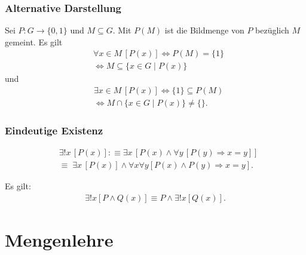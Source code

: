 \subsubsection{Alternative Darstellung}
Sei $P\colon G\to\{0,1\}$ und $M\subseteq G$.
Mit $P(M)$ ist die Bildmenge von $P$ bezüglich $M$ gemeint.
Es gilt
\begin{equation}
\begin{split}
&\forall x{\in}M\,[P(x)] \iff P(M)=\{1\}\\
& \iff M\subseteq\{x{\in}G\mid P(x)\}
\end{split}
\end{equation}
und
\begin{equation}
\begin{split}
& \exists x{\in}M\,[P(x)] \iff \{1\}\subseteq P(M)\\
& \iff M\cap\{x{\in}G\mid P(x)\}\ne\{\}.
\end{split}
\end{equation}

\subsubsection{Eindeutige Existenz}
\begin{definition}
\begin{equation}
\begin{split}
&\exists!x\,[P(x)]:\equiv
\exists x\,[P(x)\land \forall y\,[P(y)\Rightarrow x=y]]\\
&{\equiv}\;\exists x\,[P(x)]\land \forall x\forall y[P(x)\land P(y)\Rightarrow x=y].
\end{split}
\end{equation}
\end{definition}
Es gilt:
\begin{gather}
\exists!x[P\land Q(x)] \equiv P\land\exists!x[Q(x)].
\end{gather}

\newpage
\section{Mengenlehre}
